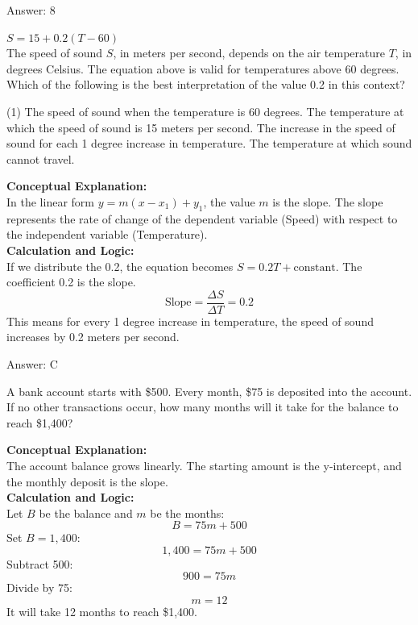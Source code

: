 \documentclass[11pt,paper=a4,answers]{exam}
\begin{document}
\begin{questions}
\begin{solution}
\vspace{15pt}
Answer: \colorbox{yellow!100}{8}
\end{solution}

\question
$S = 15 + 0.2(T - 60)$ \\
The speed of sound $S$, in meters per second, depends on the air temperature $T$, in degrees Celsius. The equation above is valid for temperatures above 60 degrees. Which of the following is the best interpretation of the value 0.2 in this context?
\begin{tasks}(1)
    \task The speed of sound when the temperature is 60 degrees.
    \task The temperature at which the speed of sound is 15 meters per second.
    \task The increase in the speed of sound for each 1 degree increase in temperature.
    \task The temperature at which sound cannot travel.
\end{tasks}

\begin{solution}
\textbf{Conceptual Explanation:} \\
In the linear form $y = m(x - x_1) + y_1$, the value $m$ is the slope. The slope represents the rate of change of the dependent variable (Speed) with respect to the independent variable (Temperature).
\\[10pt]
\textbf{Calculation and Logic:} \\
If we distribute the 0.2, the equation becomes $S = 0.2T + \text{constant}$. 
The coefficient 0.2 is the slope. 
\[\text{Slope} = \frac{\Delta S}{\Delta T} = 0.2\]
This means for every 1 degree increase in temperature, the speed of sound increases by 0.2 meters per second.

\vspace{15pt}
Answer: \colorbox{yellow!100}{C}
\end{solution}

\question
A bank account starts with \$500. Every month, \$75 is deposited into the account. If no other transactions occur, how many months will it take for the balance to reach \$1,400?

\begin{solution}
\textbf{Conceptual Explanation:} \\
The account balance grows linearly. The starting amount is the y-intercept, and the monthly deposit is the slope.
\\[10pt]
\textbf{Calculation and Logic:} \\
Let $B$ be the balance and $m$ be the months:
\[B = 75m + 500\]
Set $B = 1,400$:
\[1,400 = 75m + 500\]
Subtract 500:
\[900 = 75m\]
Divide by 75:
\[m = 12\]
It will take 12 months to reach \$1,400.


\end{solution}
\end{questions}
\end{document}
